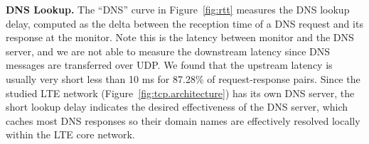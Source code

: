 \textbf{DNS Lookup.} The ``DNS'' curve in Figure~\ref{fig:rtt} measures the DNS lookup delay, computed as the delta between the reception time of a DNS request and its response at the monitor. Note this is the latency between monitor and the DNS server, and we are not able to measure the downstream latency since DNS messages are transferred over UDP. We found that the upstream latency is usually very short \ie less than 10 ms for 87.28\% of request-response pairs. Since the studied LTE network (Figure~\ref{fig:tcp.architecture}) has its own DNS server, the short lookup delay indicates the desired effectiveness of the DNS server, which caches most DNS responses so their domain names are effectively resolved locally within the LTE core network.

\begin{figure}[t]
\centering
{}\\
\label{fig:rtt.bif}
\vspace{-.1in}
\end{figure}

\begin{figure}[t]
\centering
{}\\
\label{fig:rtt.bif.linux}
\end{figure}

\begin{figure}[t]
\centering
{}\\
\label{fig:rtt.bif.verizon}
\end{figure}



\begin{figure}[h]
\centering
{}\\
\label{fig:bytes.in.flight}
\end{figure}

